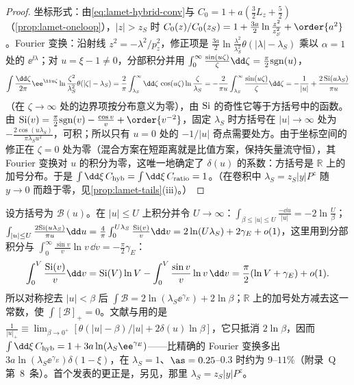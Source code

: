 \begin{proof}
坐标形式：由\cref{eq:lamet-hybrid-conv}与 $C_0=1+a(\frac32L_z+\frac52)$（\cref{prop:lamet-oneloop}），$|z|>z_S$ 时 $C_0(z)/C_0(z_S)=1+\frac{3a}2\ln\frac{z^2}{z_S^2}+\order{a^2}$。Fourier 变换：沿射线 $z^2=-\lambda^2/p_z^2$，修正项是 $\frac{3a}2\ln\frac{\lambda^2}{\lambda_S^2}\theta(|\lambda|-\lambda_S)$ 乘以 $\alpha=1$ 处的 $\ee^{\ii\lambda}$；对 $u=\xi-1\neq0$，分部积分并用 $\int_0^\infty\frac{\sin(u\zeta)}\zeta\dd\zeta=\frac\pi2{\rm sgn}(u)$，
\[
\int\frac{\dd\zeta}{2\pi}\ee^{\ii u\zeta}\ln\frac{\zeta^2}{\lambda_S^2}\theta(|\zeta|-\lambda_S)=\frac2\pi\int_{\lambda_S}^\infty\dd\zeta\,\cos(u\zeta)\ln\frac\zeta{\lambda_S}=-\frac2{\pi u}\int_{\lambda_S}^\infty\frac{\sin(u\zeta)}\zeta\dd\zeta=-\frac1{|u|}+\frac{2\,{\rm Si}(u\lambda_S)}{\pi u}
\]
（在 $\zeta\to\infty$ 处的边界项按分布意义为零），由 ${\rm Si}$ 的奇性它等于方括号中的函数。由 ${\rm Si}(v)=\frac\pi2{\rm sgn}(v)-\frac{\cos v}v+\order{v^{-2}}$，固定 $\lambda_S$ 时方括号在 $|u|\to\infty$ 处为 $-\frac{2\cos(u\lambda_S)}{\pi\lambda_Su^2}$，可积；所以只有 $u=0$ 处的 $-1/|u|$ 奇点需要处方。由于坐标空间的修正在 $\zeta=0$ 处为零（混合方案在短距离就是比值方案，保持矢量流守恒），其 Fourier 变换对 $u$ 的积分为零，这唯一地确定了 $\delta(u)$ 的系数：方括号是 $\mathbb R$ 上的加号分布。于是 $\int\dd\xi\,C_{\rm hyb}=\int\dd\xi\,C_{\rm ratio}=1$。（在卷积中 $\lambda_S=z_S|y|P^z$ 随 $y\to0$ 而趋于零，见\cref{prop:lamet-tails}(iii)。）
\end{proof}

\begin{example}[混合核的归一化]\label{ex:lamet-hybrid-normalization}
设方括号为 $\mathcal B(u)$。在 $|u|\le U$ 上积分并令 $U\to\infty$：$\int_{\beta\le|u|\le U}\frac{-\dd u}{|u|}=-2\ln\frac U\beta$；$\int_{|u|\le U}\frac{2{\rm Si}(u\lambda_S)}{\pi u}\dd u=\frac4\pi\int_0^{U\lambda_S}\frac{{\rm Si}(v)}v\dd v=2\ln(U\lambda_S)+2\gamma_E+o(1)$，这里用到分部积分与 $\int_0^\infty\frac{\sin v}v\ln v\,\dd v=-\frac\pi2\gamma_E$：
\[
\int_0^V\frac{{\rm Si}(v)}v\dd v={\rm Si}(V)\ln V-\int_0^V\frac{\sin v}v\ln v\,\dd v=\frac\pi2(\ln V+\gamma_E)+o(1).
\]
所以对称挖去 $|u|<\beta$ 后 $\int\mathcal B=2\ln(\lambda_S\ee^{\gamma_E})+2\ln\beta$；$\mathbb R$ 上的加号处方减去这一常数，使 $\int[\mathcal B]_+=0$。文献\cite[式~(33)--(34)]{Ji:2020brr}与\cite[式~(120)--(121)]{JiEtAl2021}用的是 $\frac1{|u|_+}\equiv\lim_{\beta\to0^+}[\theta(|u|-\beta)/|u|+2\delta(u)\ln\beta]$，它只抵消 $2\ln\beta$，因而 $\int\dd\xi\,C_{\rm hyb}=1+3a\ln(\lambda_S\ee^{\gamma_E})$——比精确的 Fourier 变换多出 $3a\ln(\lambda_S\ee^{\gamma_E})\delta(1-\xi)$，在 $\lambda_S=1$、$\as=0.25$–$0.3$ 时约为 $9$–$11\%$（附录~Q 第~8~条）。首个发表的更正是\cite[式~(35)]{Chou:2022drv}，另见\cite[式~(A.14)]{Su:2022fiu}，那里 $\lambda_S=z_S|y|P^z$。
\end{example}

